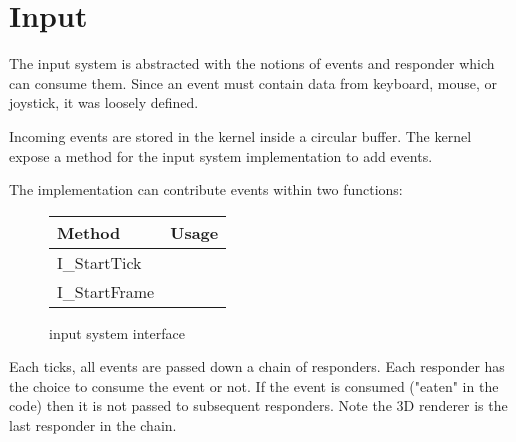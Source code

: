 \section{Input}
The input system is abstracted with the notions of events and responder which can consume them. Since an event must contain data from keyboard, mouse, or joystick, it was loosely defined.\\
\par
{}
\par
Incoming events are stored in the kernel inside a circular buffer. The kernel expose a method for the input system implementation to add events.\\
\par
{}
\par

\par
The implementation can contribute events within two functions:\\
\par
\begin{figure}[H]
\centering  
\begin{tabularx}{\textwidth}{ L{0.6}  L{1.4}}
  \toprule
  \textbf{Method} &  \textbf{Usage}\\

  \toprule 
  
I\_StartTick &\\
I\_StartFrame &\\

   \toprule
\end{tabularx}
\caption{\doom input system interface}
\end{figure}
\par


Each ticks, all events are passed down a chain of responders. Each responder has the choice to consume the event or not. If the event is consumed ("eaten" in the code) then it is not passed to subsequent responders. Note the 3D renderer is the last responder in the chain.\\
\par
{}
\par

